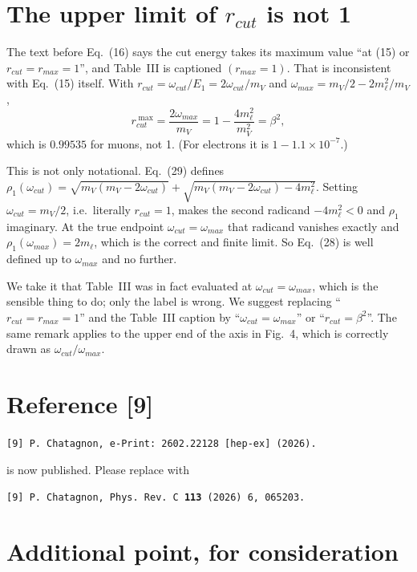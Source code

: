 \documentclass[11pt]{article}
\begin{document}
\section{The upper limit of $r_{cut}$ is not 1}

The text before Eq.~(16) says the cut energy takes its maximum value ``at (15) or
$r_{cut}=r_{max}=1$'', and Table~III is captioned $(r_{max}=1)$. That is
inconsistent with Eq.~(15) itself. With $r_{cut}=\omega_{cut}/E_1=2\omega_{cut}/m_V$
and $\omega_{max}=m_V/2-2m_\ell^{2}/m_V$,
\begin{equation*}
r_{cut}^{\;\max}=\frac{2\omega_{max}}{m_V}=1-\frac{4m_\ell^{2}}{m_V^{2}}=\beta^{2},
\end{equation*}
which is $0.99535$ for muons, not 1. (For electrons it is $1-1.1\times10^{-7}$.)

This is not only notational. Eq.~(29) defines
$\rho_1(\omega_{cut})=\sqrt{m_V(m_V-2\omega_{cut})}+\sqrt{m_V(m_V-2\omega_{cut})-4m_\ell^{2}}$.
Setting $\omega_{cut}=m_V/2$, i.e.\ literally $r_{cut}=1$, makes the second
radicand $-4m_\ell^{2}<0$ and $\rho_1$ imaginary. At the true endpoint
$\omega_{cut}=\omega_{max}$ that radicand vanishes exactly and
$\rho_1(\omega_{max})=2m_\ell$, which is the correct and finite limit. So Eq.~(28)
is well defined up to $\omega_{max}$ and no further.

We take it that Table~III was in fact evaluated at $\omega_{cut}=\omega_{max}$,
which is the sensible thing to do; only the label is wrong. We suggest replacing
``$r_{cut}=r_{max}=1$'' and the Table~III caption by ``$\omega_{cut}=\omega_{max}$''
or ``$r_{cut}=\beta^{2}$''. The same remark applies to the upper end of the axis
in Fig.~4, which is correctly drawn as $\omega_{cut}/\omega_{max}$.

\section{Reference [9]}

\begin{center}
\texttt{[9] P. Chatagnon, e-Print: 2602.22128 [hep-ex] (2026).}
\end{center}
is now published. Please replace with
\begin{center}
\texttt{[9] P. Chatagnon, Phys. Rev. C \textbf{113} (2026) 6, 065203.}
\end{center}

\section*{Additional point, for consideration}
\end{document}
